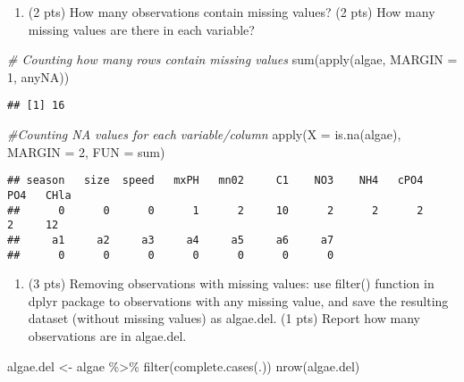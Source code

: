 \documentclass[
]{article}
\newenvironment{Shaded}{\begin{snugshade}}{\end{snugshade}}
\newcommand{\AttributeTok}[1]{\textcolor[rgb]{0.77,0.63,0.00}{#1}}
\newcommand{\CommentTok}[1]{\textcolor[rgb]{0.56,0.35,0.01}{\textit{#1}}}
\newcommand{\DecValTok}[1]{\textcolor[rgb]{0.00,0.00,0.81}{#1}}
\newcommand{\FunctionTok}[1]{\textcolor[rgb]{0.00,0.00,0.00}{#1}}
\newcommand{\NormalTok}[1]{#1}
\newcommand{\OtherTok}[1]{\textcolor[rgb]{0.56,0.35,0.01}{#1}}
\newcommand{\SpecialCharTok}[1]{\textcolor[rgb]{0.00,0.00,0.00}{#1}}
\providecommand{\tightlist}{%
  \setlength{\itemsep}{0pt}\setlength{\parskip}{0pt}}
\begin{document}
\begin{enumerate}
\def\labelenumi{\alph{enumi}.}
\tightlist
\item
  (2 pts) How many observations contain missing values? (2 pts) How many
  missing values are there in each variable?
\end{enumerate}

\begin{Shaded}
\begin{Highlighting}[]
\CommentTok{\# Counting how many rows contain missing values}
\FunctionTok{sum}\NormalTok{(}\FunctionTok{apply}\NormalTok{(algae, }\AttributeTok{MARGIN =} \DecValTok{1}\NormalTok{, anyNA))}
\end{Highlighting}
\end{Shaded}

\begin{verbatim}
## [1] 16
\end{verbatim}

\begin{Shaded}
\begin{Highlighting}[]
\CommentTok{\#Counting NA values for each variable/column}
\FunctionTok{apply}\NormalTok{(}\AttributeTok{X =} \FunctionTok{is.na}\NormalTok{(algae), }\AttributeTok{MARGIN =} \DecValTok{2}\NormalTok{, }\AttributeTok{FUN =}\NormalTok{ sum)}
\end{Highlighting}
\end{Shaded}

\begin{verbatim}
## season   size  speed   mxPH   mn02     C1    NO3    NH4   cPO4    PO4   CHla 
##      0      0      0      1      2     10      2      2      2      2     12 
##     a1     a2     a3     a4     a5     a6     a7 
##      0      0      0      0      0      0      0
\end{verbatim}

\begin{enumerate}
\def\labelenumi{\alph{enumi}.}
\setcounter{enumi}{1}
\tightlist
\item
  (3 pts) Removing observations with missing values: use filter()
  function in dplyr package to observations with any missing value, and
  save the resulting dataset (without missing values) as algae.del. (1
  pts) Report how many observations are in algae.del.
\end{enumerate}

\begin{Shaded}
\begin{Highlighting}[]
\NormalTok{algae.del }\OtherTok{\textless{}{-}}\NormalTok{ algae }\SpecialCharTok{\%\textgreater{}\%} \FunctionTok{filter}\NormalTok{(}\FunctionTok{complete.cases}\NormalTok{(.))}
\FunctionTok{nrow}\NormalTok{(algae.del)}
\end{Highlighting}
\end{Shaded}
\end{document}
